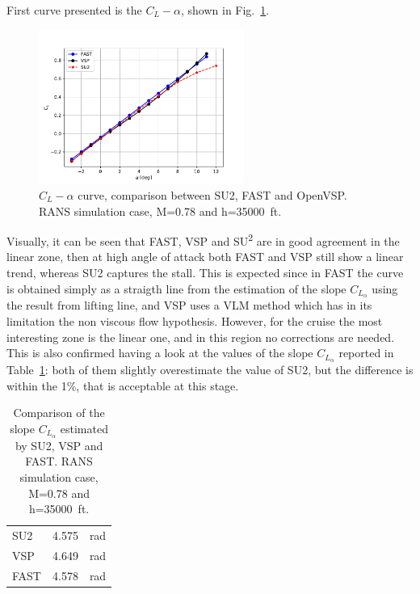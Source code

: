 First curve presented is the $C_L-\alpha$, shown in Fig.~\ref{fig:cl_alpha_rans}.
\begin{figure}[!h]
	\centering
	\includegraphics[keepaspectratio, width=0.6\textwidth]{images/chap4/cl_alpha_rans}
	\caption{$C_L-\alpha$ curve, comparison between SU2, FAST and OpenVSP. RANS simulation case, M=0.78 and h=35000~ft.}
	\label{fig:cl_alpha_rans}
\end{figure}
Visually, it can be seen that FAST, VSP and SU\textsuperscript{2} are in good agreement in the linear zone, then at high angle of attack both FAST and VSP still show a linear trend, whereas SU2 captures the stall. 
This is expected since in FAST the curve is obtained simply as a straigth line from the estimation of the slope $C_{L_{\alpha}}$ using the result from lifting line, and VSP uses a VLM method which has in its limitation the non viscous flow hypothesis. 
However, for the cruise the most interesting zone is the linear one, and in this region no corrections are needed. 
This is also confirmed having a look at the values of the slope $C_{L_{\alpha}}$ reported in Table~\ref{tab:cla_rans_comparison}: both of them slightly overestimate the value of SU2, but the difference is within the 1\%, that is acceptable at this stage. 
\begin{table}[!h]
	\centering
	\begin{tabular}{l c}
		\hline
		SU2 & 4.575~\si{\per\radian} \\ 
		VSP & 4.649~\si{\per\radian} \\
		FAST & 4.578~\si{\per\radian} \\
		\hline
	\end{tabular}
	\caption{Comparison of the slope $C_{L_{\alpha}}$ estimated by SU2, VSP and FAST. RANS simulation case, M=0.78 and h=35000~ft.}
	\label{tab:cla_rans_comparison}
\end{table}

